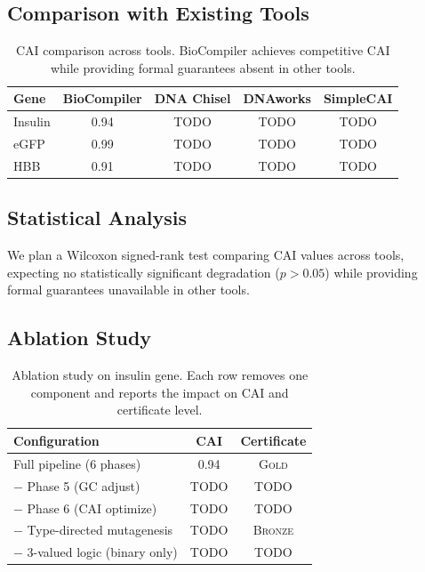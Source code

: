 \documentclass[runningheads]{llncs}
\newcommand{\GOLD}{\textsc{Gold}\xspace}
\newcommand{\BRONZE}{\textsc{Bronze}\xspace}
\begin{document}
\subsection{Comparison with Existing Tools}

\begin{table}[t]
\centering
\caption{CAI comparison across tools. BioCompiler achieves competitive
         CAI while providing formal guarantees absent in other tools.}
\label{tab:caicomparison}
\begin{tabular}{lcccc}
\toprule
\textbf{Gene} & \textbf{BioCompiler} & \textbf{DNA Chisel} &
  \textbf{DNAworks} & \textbf{SimpleCAI} \\
\midrule
Insulin & 0.94 & TODO & TODO & TODO \\
eGFP    & 0.99 & TODO & TODO & TODO \\
HBB     & 0.91 & TODO & TODO & TODO \\
\bottomrule
\end{tabular}
\end{table}

\subsection{Statistical Analysis}


We plan a Wilcoxon signed-rank test comparing CAI values across tools,
expecting no statistically significant degradation ($p > 0.05$) while
providing formal guarantees unavailable in other tools.

\subsection{Ablation Study}

\begin{table}[t]
\centering
\caption{Ablation study on insulin gene. Each row removes one
         component and reports the impact on CAI and certificate
         level.}
\label{tab:ablation}
\begin{tabular}{lcc}
\toprule
\textbf{Configuration} & \textbf{CAI} & \textbf{Certificate} \\
\midrule
Full pipeline (6 phases) & 0.94 & \GOLD \\
$-$ Phase 5 (GC adjust) & TODO & TODO \\
$-$ Phase 6 (CAI optimize) & TODO & TODO \\
$-$ Type-directed mutagenesis & TODO & \BRONZE \\
$-$ 3-valued logic (binary only) & TODO & TODO \\
\bottomrule
\end{tabular}
\end{table}
\end{document}
